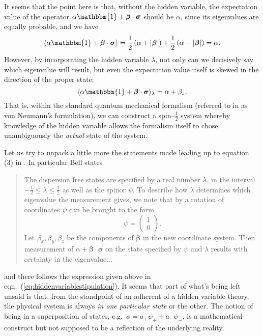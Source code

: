 \documentclass[12pt]{article}
\begin{document}
It seems that the point here is that, without the hidden variable, the expectation value of the operator $\alpha \mathbbm{1} + \bm{\beta} \cdot \bm{\sigma}$ should be $\alpha$, since its eigenvalues are equally probable, and we have
\begin{displaymath}
  \langle \alpha \mathbbm{1} + \bm{\beta} \cdot \bm{\sigma} \rangle
  = \frac{1}{2} \left( \alpha + |\bm{\beta}| \right) + \frac{1}{2} \left( \alpha - |\bm{\beta}| \right)
  = \alpha.
\end{displaymath}
However, by incorporating the hidden variable $\lambda$, not only can we decisively say which eigenvalue will result, but even the expectation value itself is skewed in the direction of the proper state:
\begin{displaymath}
  \langle \alpha \mathbbm{1} + \bm{\beta} \cdot \bm{\sigma} \rangle_{\lambda} = \alpha + \beta_z.
\end{displaymath}
That is, within the standard quantum mechanical formalism (referred to in \cite{Bell1966} as von Neumann's formulation), we can construct a spin--$\frac{1}{2}$ system whereby knowledge of the hidden variable allows the formalism itself to chose unambiguously the \emph{actual} state of the system.

Let us try to unpack a little more the statements made leading up to equation (3) in \cite[p.448]{Bell1966}.  In particular Bell states
\begin{quotation}
  \begin{small}
    The dispersion free states are specified by a real number $\lambda$, in the interval $-\frac{1}{2} \le \lambda \le \frac{1}{2}$ as well as the spinor $\psi$. To describe how $\lambda$ determines which eigenvalue the measurement gives, we note that by a rotation of coordinates $\psi$ can be brought to the form
    \begin{displaymath}
      \psi =
      \begin{pmatrix}
        1 \\
        0
      \end{pmatrix}.
    \end{displaymath}
    Let $\beta_x, \beta_y, \beta_z$ be the components of $\bm{\beta}$ in the new coordinate system. Then measurement of $\alpha + \bm{\beta} \cdot \bm{\sigma}$ on the state specified by $\psi$ and $\lambda$ results with certainty in the eigenvalue...
  \end{small}
\end{quotation}
and there follows the expression given above in eqn.~(\ref{eq:hiddenvariablestipulation}).  It seems that part of what's being left unsaid is that, from the standpoint of an adherent of a hidden variable theory, the physical system is always \emph{in one particular state} or the other.  The notion of being in a superposition of states, e.g.\ $\phi = a_{+} \psi_{+} + a_{-} \psi_{-}$, is a mathematical construct but not supposed to be a reflection of the underlying reality.
\end{document}
